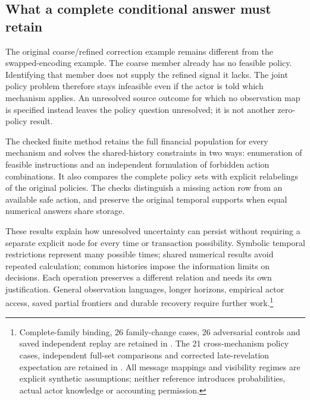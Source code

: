 \subsection{What a complete conditional answer must retain}

The original coarse/refined correction example remains different from the swapped-encoding example. The coarse member already has no feasible policy. Identifying that member does not supply the refined signal it lacks. The joint policy problem therefore stays infeasible even if the actor is told which mechanism applies. An unresolved source outcome for which no observation map is specified instead leaves the policy question unresolved; it is not another zero-policy result.

The checked finite method retains the full financial population for every mechanism and solves the shared-history constraints in two ways: enumeration of feasible instructions and an independent formulation of forbidden action combinations. It also compares the complete policy sets with explicit relabelings of the original policies. The checks distinguish a missing action row from an available safe action, and preserve the original temporal supports when equal numerical answers share storage.

These results explain how unresolved uncertainty can persist without requiring a separate explicit node for every time or transaction possibility. Symbolic temporal restrictions represent many possible times; shared numerical results avoid repeated calculation; common histories impose the information limits on decisions. Each operation preserves a different relation and needs its own justification. General observation languages, longer horizons, empirical actor access, saved partial frontiers and durable recovery require further work.\footnote{Complete-family binding, 26 family-change cases, 26 adversarial controls and saved independent replay are retained in . The 21 cross-mechanism policy cases, independent full-set comparisons and corrected late-revelation expectation are retained in . All message mappings and visibility regimes are explicit synthetic assumptions; neither reference introduces probabilities, actual actor knowledge or accounting permission.}
